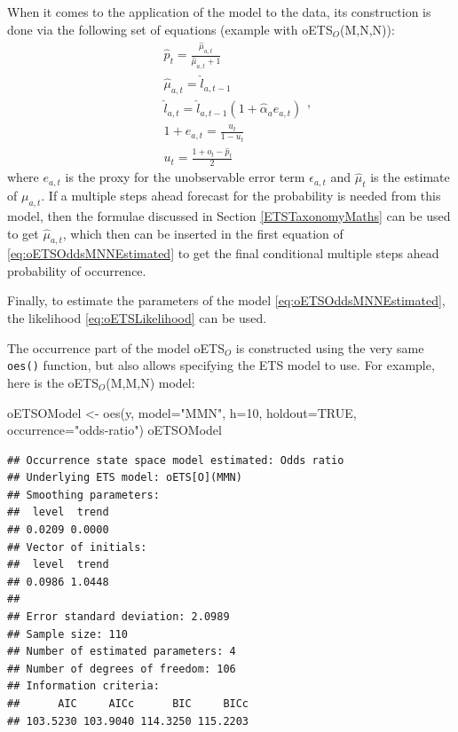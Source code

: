 \documentclass[
]{book}
\newenvironment{Shaded}{\begin{snugshade}}{\end{snugshade}}
\newcommand{\AttributeTok}[1]{\textcolor[rgb]{0.77,0.63,0.00}{#1}}
\newcommand{\ConstantTok}[1]{\textcolor[rgb]{0.00,0.00,0.00}{#1}}
\newcommand{\DecValTok}[1]{\textcolor[rgb]{0.00,0.00,0.81}{#1}}
\newcommand{\FunctionTok}[1]{\textcolor[rgb]{0.00,0.00,0.00}{#1}}
\newcommand{\NormalTok}[1]{#1}
\newcommand{\OtherTok}[1]{\textcolor[rgb]{0.56,0.35,0.01}{#1}}
\newcommand{\StringTok}[1]{\textcolor[rgb]{0.31,0.60,0.02}{#1}}
\theoremstyle{definition}
\theoremstyle{definition}
\theoremstyle{definition}
\theoremstyle{definition}
\theoremstyle{remark}
\begin{document}
When it comes to the application of the model to the data, its construction is done via the following set of equations (example with oETS\(_O\)(M,N,N)):
\begin{equation}
    \begin{aligned}
        & \hat{p}_t = \frac{\hat{\mu}_{a,t}}{\hat{\mu}_{a,t}+1} \\
        & \hat{\mu}_{a,t} = \hat{l}_{a,t-1} \\
        & \hat{l}_{a,t} = \hat{l}_{a,t-1}( 1  + \hat{\alpha}_{a} e_{a,t}) \\
        & 1+e_{a,t} = \frac{u_t}{1-u_t} \\
        & u_{t} = \frac{1 + o_t -\hat{p}_t}{2}
    \end{aligned},
    \label{eq:oETSOddsMNNEstimated}
\end{equation}
where \(e_{a,t}\) is the proxy for the unobservable error term \(\epsilon_{a,t}\) and \(\hat{\mu}_t\) is the estimate of \(\mu_{a,t}\). If a multiple steps ahead forecast for the probability is needed from this model, then the formulae discussed in Section \ref{ETSTaxonomyMaths} can be used to get \(\hat{\mu}_{a,t}\), which then can be inserted in the first equation of \eqref{eq:oETSOddsMNNEstimated} to get the final conditional multiple steps ahead probability of occurrence.

Finally, to estimate the parameters of the model \eqref{eq:oETSOddsMNNEstimated}, the likelihood \eqref{eq:oETSLikelihood} can be used.

The occurrence part of the model oETS\(_O\) is constructed using the very same \texttt{oes()} function, but also allows specifying the ETS model to use. For example, here is the oETS\(_O\)(M,M,N) model:

\begin{Shaded}
\begin{Highlighting}[]
\NormalTok{oETSOModel }\OtherTok{\textless{}{-}} \FunctionTok{oes}\NormalTok{(y, }\AttributeTok{model=}\StringTok{"MMN"}\NormalTok{, }\AttributeTok{h=}\DecValTok{10}\NormalTok{, }\AttributeTok{holdout=}\ConstantTok{TRUE}\NormalTok{,}
                  \AttributeTok{occurrence=}\StringTok{"odds{-}ratio"}\NormalTok{)}
\NormalTok{oETSOModel}
\end{Highlighting}
\end{Shaded}

\begin{verbatim}
## Occurrence state space model estimated: Odds ratio
## Underlying ETS model: oETS[O](MMN)
## Smoothing parameters:
##  level  trend 
## 0.0209 0.0000 
## Vector of initials:
##  level  trend 
## 0.0986 1.0448 
## 
## Error standard deviation: 2.0989
## Sample size: 110
## Number of estimated parameters: 4
## Number of degrees of freedom: 106
## Information criteria: 
##      AIC     AICc      BIC     BICc 
## 103.5230 103.9040 114.3250 115.2203
\end{verbatim}
\end{document}
